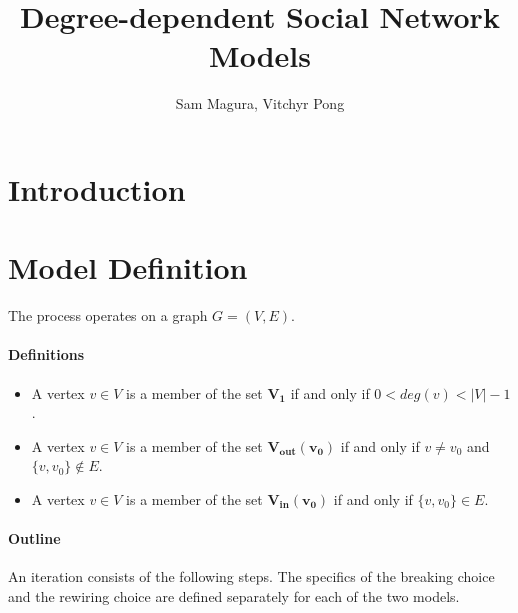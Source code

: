 \documentclass[a4paper,10pt]{article}
\title{Degree-dependent Social Network Models}
\author{Sam Magura, Vitchyr Pong}
\begin{document}
\maketitle

\section{Introduction}


\section{Model Definition}

The process operates on a graph $G = (V, E)$.

\paragraph{Definitions}
\begin{itemize}
 \item A vertex $v \in V$ is a member of the set $\mathbf{V_1}$ if and only if $0 < deg(v) < |V| - 1$.
 \item A vertex $v \in V$ is a member of the set $\mathbf{V_{out}(v_0)}$ if and only if $v \neq v_0$ and $\{v, v_0\} \notin E$. 
 \item A vertex $v \in V$ is a member of the set $\mathbf{V_{in}(v_0)}$ if and only if $\{v, v_0\} \in E$. 
\end{itemize}

\paragraph{Outline} An iteration consists of the following steps. The specifics of the breaking choice and the rewiring choice are defined separately for each of the two models.
\end{document}

